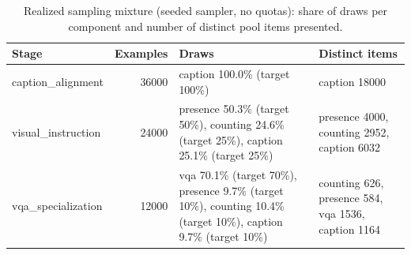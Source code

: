 \begin{table}[t]
\centering
\small
\caption{Realized sampling mixture (seeded sampler, no quotas): share of draws per component and number of distinct pool items presented.}
\label{tab:t2_t13_training_mixture_main}
\begin{tabular}{lrll}
\toprule
Stage & Examples & Draws & Distinct items \\
\midrule
caption\_alignment & 36000 & caption 100.0\% (target 100\%) & caption 18000 \\
visual\_instruction & 24000 & presence 50.3\% (target 50\%), counting 24.6\% (target 25\%), caption 25.1\% (target 25\%) & presence 4000, counting 2952, caption 6032 \\
vqa\_specialization & 12000 & vqa 70.1\% (target 70\%), presence 9.7\% (target 10\%), counting 10.4\% (target 10\%), caption 9.7\% (target 10\%) & counting 626, presence 584, vqa 1536, caption 1164 \\
\bottomrule
\end{tabular}
\end{table}
